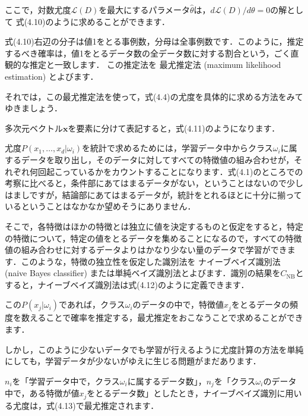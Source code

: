 

ここで，対数尤度$\mathcal{L}(D)$を最大にするパラメータ$\hat{\theta}$は，$d \mathcal{L}(D) / d\theta = 0$の解として
式(4.10)のように求めることができます．


式(4.10)右辺の分子は値1をとる事例数，分母は全事例数です．このように，推定するべき確率は，値1をとるデータ数の全データ数に対する割合という，ごく直観的な推定と一致します．
この推定法を
最尤推定法 (maximum likelihood estimation) 
とよびます．


それでは，この最尤推定法を使って，式(4.4)の尤度を具体的に求める方法をみてゆきましょう．

多次元ベクトル$\bm{x}$を要素に分けて表記すると，式(4.11)のようになります．


尤度$ P(x_{1}, \dots, x_d \vert \omega_i)$を統計で求めるためには，学習データ中からクラス$\omega_i$に属するデータを取り出し，そのデータに対してすべての特徴値の組み合わせが，それぞれ何回起こっているかをカウントすることになります．式(4.1)のところでの考察に比べると，条件部にあてはまるデータがない，ということはないので少しはましですが，結論部にあてはまるデータが，統計をとれるほとに十分に揃っているということはなかなか望めそうにありません．

そこで，各特徴はほかの特徴とは独立に値を決定するものと仮定をすると，特定の特徴について，特定の値をとるデータを集めることになるので，すべての特徴値の組み合わせに対するデータよりはかなり少ない量のデータで学習ができます．このような，特徴の独立性を仮定した識別法を
ナイーブベイズ識別法 (naive Bayes classifier)
または単純ベイズ識別法とよびます．識別の結果を$C_{\mbox{NB}}$とすると，ナイーブベイズ識別法は式(4.12)のように定義できます．


この$P(x_{j} \vert \omega_i)$であれば，クラス$\omega_i$のデータの中で，特徴値$x_{j}$をとるデータの頻度を数えることで確率を推定する，最尤推定をおこなうことで求めることができます．


しかし，このように少ないデータでも学習が行えるように尤度計算の方法を単純にしても，学習データが少ないがゆえに生じる問題がまだあります．

$n_i$を「学習データ中で，クラス$\omega_i$に属するデータ数」，$n_{j}$を「クラス$\omega_i$のデータ中で，ある特徴が値$x_j$をとるデータ数」としたとき，ナイーブベイズ識別に用いる尤度は，式(4.13)で最尤推定されます．

